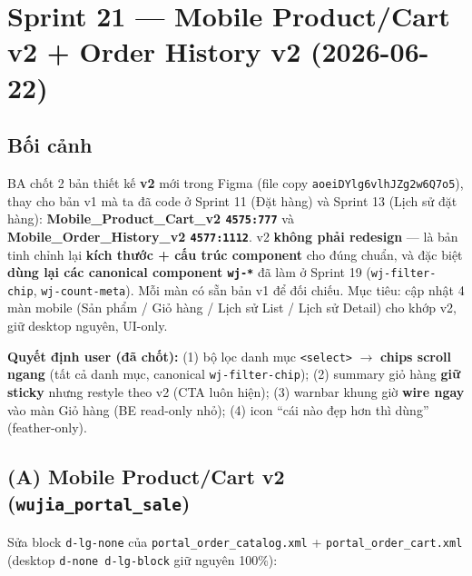 \chapter{Sprint 21 --- Mobile Product/Cart v2 + Order History v2 (2026-06-22)}

\section{Bối cảnh}

BA chốt 2 bản thiết kế \textbf{v2} mới trong Figma (file copy \texttt{aoeiDYlg6vlhJZg2w6Q7o5}),
thay cho bản v1 mà ta đã code ở Sprint 11 (Đặt hàng) và Sprint 13 (Lịch sử đặt hàng):
\textbf{Mobile\_Product\_Cart\_v2 \texttt{4575:777}} và \textbf{Mobile\_Order\_History\_v2
\texttt{4577:1112}}. v2 \textbf{không phải redesign} --- là bản tinh chỉnh lại
\textbf{kích thước + cấu trúc component} cho đúng chuẩn, và đặc biệt \textbf{dùng lại các
canonical component \texttt{wj-*}} đã làm ở Sprint 19 (\texttt{wj-filter-chip},
\texttt{wj-count-meta}). Mỗi màn có sẵn bản v1 để đối chiếu. Mục tiêu: cập nhật 4 màn mobile
(Sản phẩm / Giỏ hàng / Lịch sử List / Lịch sử Detail) cho khớp v2, giữ desktop nguyên, UI-only.

\textbf{Quyết định user (đã chốt):} (1) bộ lọc danh mục \texttt{<select>} \(\rightarrow\)
\textbf{chips scroll ngang} (tất cả danh mục, canonical \texttt{wj-filter-chip}); (2) summary giỏ
hàng \textbf{giữ sticky} nhưng restyle theo v2 (CTA luôn hiện); (3) warnbar khung giờ \textbf{wire
ngay} vào màn Giỏ hàng (BE read-only nhỏ); (4) icon ``cái nào đẹp hơn thì dùng'' (feather-only).

\section{(A) Mobile Product/Cart v2 (\texttt{wujia\_portal\_sale})}

Sửa block \texttt{d-lg-none} của \texttt{portal\_order\_catalog.xml} + \texttt{portal\_order\_cart.xml}
(desktop \texttt{d-none d-lg-block} giữ nguyên 100\%):

